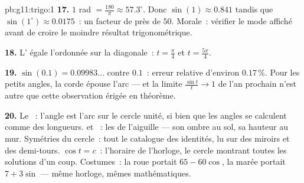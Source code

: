 \begin{solution}{pb:g11:trigo:1}
\textbf{17.} $1$ rad $= \frac{180}{\pi} \approx 57.3^\circ$. Donc
$\sin(1) \approx 0.841$ tandis que
$\sin(1^\circ) \approx 0.0175$~: un facteur de près de $50$.
Morale~: vérifier le mode affiché avant de croire le moindre
résultat trigonométrique.

\textbf{18.} L' égale l'ordonnée sur la diagonale~:
$t = \frac\pi4$ et $t = \frac{5\pi}{4}$.

\textbf{19.} $\sin(0.1) = 0.09983\ldots$ contre $0.1$~: erreur
relative d'environ $0.17\,\%$. Pour les petits angles, la corde
épouse l'arc --- et la limite $\frac{\sin t}{t} \to 1$ de l'an
prochain n'est autre que cette observation érigée en théorème.

\textbf{20.} Le ~: l'angle est l'arc sur le cercle unité, si
bien que les angles se calculent comme des longueurs.  et
~: les  de l'aiguille --- son ombre au sol, sa
hauteur au mur. Symétries du cercle~: tout le catalogue des
identités, lu sur des miroirs et des demi-tours. 
$\cos t = c$~: l'horaire de l'horloge, le cercle montrant toutes les
solutions d'un coup. Costumes~: la roue portait $65 - 60\cos$, la
marée portait $7 + 3\sin$ --- même horloge, mêmes mathématiques.
\end{solution}
